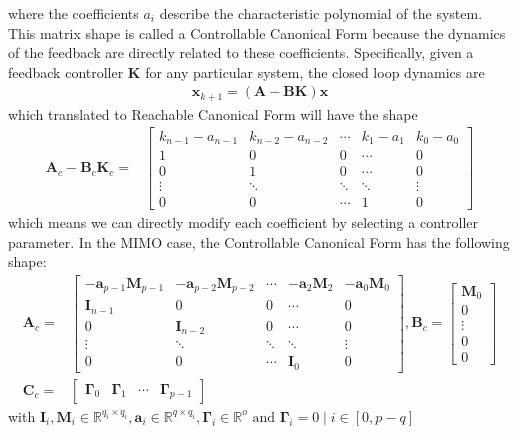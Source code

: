 \documentclass[sigconf]{llncs}
\newcommand{\mat}[1]{\boldsymbol{#1}}
\renewcommand{\vec}[1]{\boldsymbol{#1}}
\begin{document}
where the coefficients $a_i$ describe the characteristic polynomial of the system. This matrix shape is
called a Controllable Canonical Form because the dynamics of the feedback are directly related to these
coefficients. Specifically, given a feedback controller $\mat{K}$ for any particular system, the closed loop dynamics
are
\begin{align}
\vec{x}_{k+1}=(\mat{A}-\mat{B}\mat{K})\vec{x}
\label{eq:closeloopdynamics}
\end{align}
which translated to Reachable Canonical Form will have the shape
\begin{align}
\mat{A}_c-\mat{B}_c\mat{K}_c=&\left[
\begin{array}{ccccc}
k_{n-1}-a_{n-1}&k_{n-2}-a_{n-2}&\cdots&k_1-a_1&k_0-a_0\\
1&0&0&\cdots&0\\
0&1&0&\cdots&0\\
\vdots&\ddots&\ddots&\ddots&\vdots\\
0&0&\cdots&1&0
\end{array}\right]
\label{eq:cf_SISO_fb}
\end{align}
which means we can directly modify each coefficient by selecting a controller parameter.
In the MIMO case, the Controllable Canonical Form has the following shape:
\begin{align}
\mat{A}_c=&\left[
\begin{array}{ccccc}
-\mat{a}_{p-1}\mat{M}_{p-1}&-\mat{a}_{p-2}\mat{M}_{p-2}&\cdots&-\mat{a}_{2}\mat{M}_{2}&-\mat{a}_0\mat{M}_0\\
\mat{I}_{n-1}&0&0&\cdots&0\\
0&\mat{I}_{n-2}&0&\cdots&0\\
\vdots&\ddots&\ddots&\ddots&\vdots\\
0&0&\cdots&\mat{I}_0&0
\end{array}\right],
\mat{B}_c=\left[
\begin{array}{c}
\mat{M}_0\\0\\ \vdots\\ 0\\ 0
\end{array}\right]\nonumber\\
\mat{C}_c=&[\begin{array}{ccccc}\mat{\Gamma}_{0}&\mat{\Gamma}_{1}&\cdots&\mat{\Gamma}_{p-1}\end{array}] 
\label{eq:cf_MIMO}
\end{align}
with $\mat{I}_i,\mat{M}_i \in \mathbb{R}^{q_i \times q_i}, \mat{a}_i \in \mathbb{R}^{q \times q_i}, \mat{\Gamma}_i \in \mathbb{R}^o \text{ and }  \mat{\Gamma}_{i}=0 \mid i \in [0,p-q]$
\end{document}
